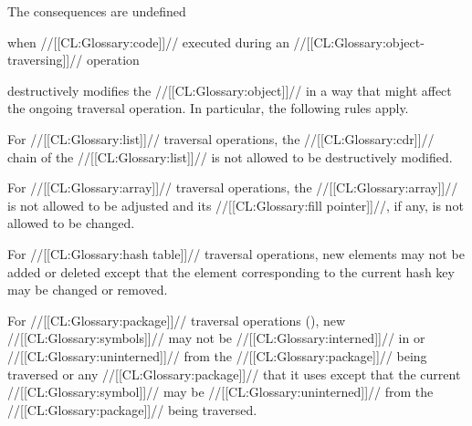 

  The consequences are undefined 

when //[[CL:Glossary:code]]// executed during an //[[CL:Glossary:object-traversing]]// operation

destructively modifies the //[[CL:Glossary:object]]// in a way that might affect the ongoing traversal operation. In particular, the following rules apply. \beginlist {}
 
 For //[[CL:Glossary:list]]// traversal operations, the //[[CL:Glossary:cdr]]// chain of the
 //[[CL:Glossary:list]]// is not allowed to be destructively modified.

  For //[[CL:Glossary:array]]// traversal operations, the //[[CL:Glossary:array]]// is not allowed 
  to be adjusted and its //[[CL:Glossary:fill pointer]]//, if any, is not allowed to 
  be changed.

  For //[[CL:Glossary:hash table]]// traversal operations, new elements may not be added
  or deleted except that the element corresponding to the current hash key 
  may be changed or removed.

  For //[[CL:Glossary:package]]// traversal operations (\eg {}),
  new //[[CL:Glossary:symbols]]// may not be //[[CL:Glossary:interned]]// in or //[[CL:Glossary:uninterned]]// 
  from the //[[CL:Glossary:package]]// being traversed 
  or any //[[CL:Glossary:package]]// that it uses except that the 
  current //[[CL:Glossary:symbol]]// may be //[[CL:Glossary:uninterned]]// from the //[[CL:Glossary:package]]// 
  being traversed.

\endlist 

